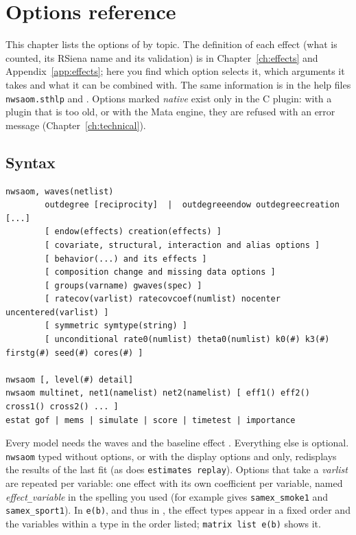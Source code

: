 \chapter{Options reference}\label{ch:options}

This chapter lists the options of \nwsaom{} by topic. The definition of each effect (what is counted, its RSiena name and its validation) is in Chapter~\ref{ch:effects} and Appendix~\ref{app:effects}; here you find which option selects it, which arguments it takes and what it can be combined with. The same information is in the help files \texttt{nwsaom.sthlp} and . Options marked \emph{native} exist only in the C plugin: with a plugin that is too old, or with the Mata engine, they are refused with an error message (Chapter~\ref{ch:technical}).

\section{Syntax}

\begin{lstlisting}
nwsaom, waves(netlist)
        outdegree [reciprocity]  |  outdegreeendow outdegreecreation [...]
        [ endow(effects) creation(effects) ]
        [ covariate, structural, interaction and alias options ]
        [ behavior(...) and its effects ]
        [ composition change and missing data options ]
        [ groups(varname) gwaves(spec) ]
        [ ratecov(varlist) ratecovcoef(numlist) nocenter uncentered(varlist) ]
        [ symmetric symtype(string) ]
        [ unconditional rate0(numlist) theta0(numlist) k0(#) k3(#) firstg(#) seed(#) cores(#) ]

nwsaom [, level(#) detail]
nwsaom multinet, net1(namelist) net2(namelist) [ eff1() eff2() cross1() cross2() ... ]
estat gof | mems | simulate | score | timetest | importance
\end{lstlisting}
Every model needs the waves and the baseline effect . Everything else is optional. \texttt{nwsaom} typed without options, or with the display options  and  only, redisplays the results of the last fit (as does \texttt{estimates replay}). Options that take a \emph{varlist} are repeated per variable: one effect with its own coefficient per variable, named \emph{effect}\texttt{\_}\emph{variable} in the spelling you used (for example  gives \texttt{samex\_smoke1} and \texttt{samex\_sport1}). In \texttt{e(b)}, and thus in , the effect types appear in a fixed order and the variables within a type in the order listed; \texttt{matrix list e(b)} shows it.

